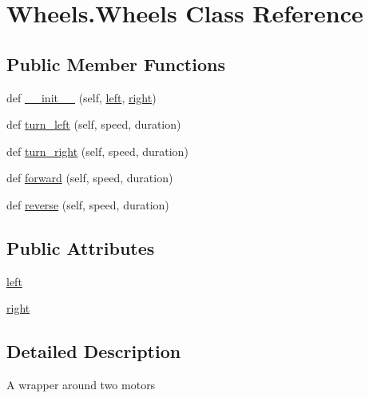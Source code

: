 \hypertarget{class_wheels_1_1_wheels}{}\section{Wheels.\+Wheels Class Reference}
\label{class_wheels_1_1_wheels}
\subsection*{Public Member Functions}
\begin{DoxyCompactItemize}
\item 
def \mbox{\hyperlink{class_wheels_1_1_wheels_afab89c68fc8a1f8aeb8b932d97cf7999}{\+\_\+\+\_\+init\+\_\+\+\_\+}} (self, \mbox{\hyperlink{class_wheels_1_1_wheels_a47e8526b08d3a33a7c03524bde27b659}{left}}, \mbox{\hyperlink{class_wheels_1_1_wheels_ac10912e5e2dc289a21f222787c4e0f98}{right}})
\item 
def \mbox{\hyperlink{class_wheels_1_1_wheels_a71354795014dc6c28125b1c86666b8b4}{turn\+\_\+left}} (self, speed, duration)
\item 
def \mbox{\hyperlink{class_wheels_1_1_wheels_a325e09d58c40e88dbe2d1fda1295b26f}{turn\+\_\+right}} (self, speed, duration)
\item 
def \mbox{\hyperlink{class_wheels_1_1_wheels_a30bd7a5a1d962cad87a27409d1afbcd4}{forward}} (self, speed, duration)
\item 
def \mbox{\hyperlink{class_wheels_1_1_wheels_ae243add297cf9719249b658818c9a229}{reverse}} (self, speed, duration)
\end{DoxyCompactItemize}
\subsection*{Public Attributes}
\begin{DoxyCompactItemize}
\item 
\mbox{\hyperlink{class_wheels_1_1_wheels_a47e8526b08d3a33a7c03524bde27b659}{left}}
\item 
\mbox{\hyperlink{class_wheels_1_1_wheels_ac10912e5e2dc289a21f222787c4e0f98}{right}}
\end{DoxyCompactItemize}


\subsection{Detailed Description}
\begin{DoxyVerb}A wrapper around two motors
\end{DoxyVerb}
 

